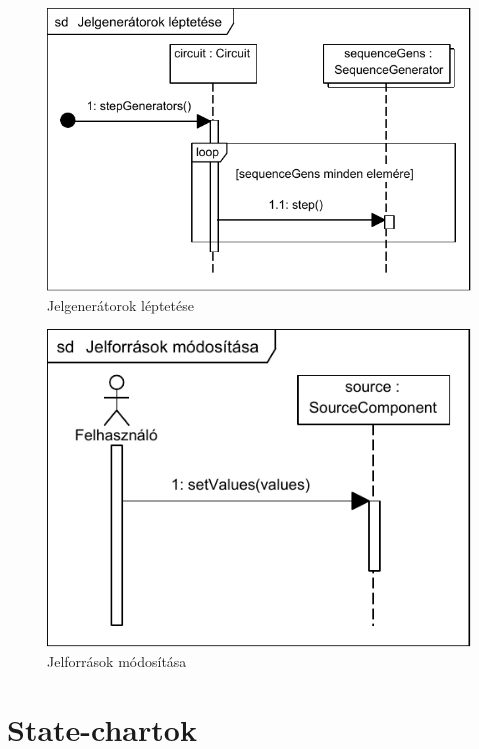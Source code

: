 \begin{figure}[H]
\begin{center}
\includegraphics{chapters/chapter04/seqdiagrams/new/stepGenerators.pdf}
\caption{Jelgenerátorok léptetése}
\label{fig:step_gens}
\end{center}
\end{figure}

\begin{figure}[H]
\begin{center}
\includegraphics{chapters/chapter04/seqdiagrams/jelforrasok_modositasa.pdf}
\caption{Jelforrások módosítása}
\label{fig:jelforrasok_modositasa}
\end{center}
\end{figure}

\section{State-chartok}

